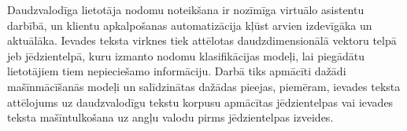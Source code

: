 Daudzvalodīga lietotāja nodomu noteikšana ir nozīmīga virtuālo asistentu darbībā, un klientu apkalpošanas automatizācija kļūst arvien izdevīgāka un aktuālāka. Ievades teksta virknes tiek attēlotas daudzdimensionālā vektoru telpā jeb jēdzientelpā, kuru izmanto nodomu klasifikācijas modeļi, lai piegādātu lietotājiem tiem nepieciešamo informāciju. Darbā tiks apmācīti dažādi mašīnmācīšanās modeļi un salīdzinātas dažādas pieejas, piemēram, ievades teksta attēlojums uz daudzvalodīgu tekstu korpusu apmācītas jēdzientelpas vai ievades teksta mašīntulkošana uz angļu valodu pirms jēdzientelpas izveides.

